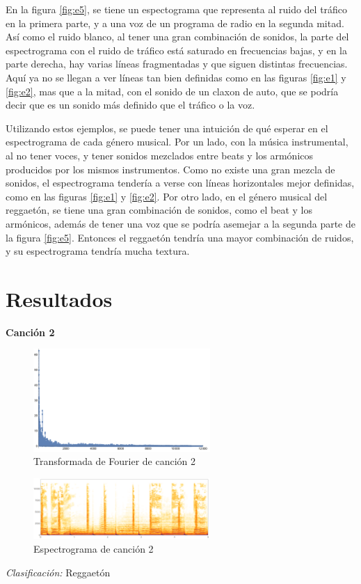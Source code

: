 \documentclass[12pt, letterpaper]{article}
\begin{document}
\noindent En la figura \ref{fig:e5}, se tiene un espectograma que representa al
ruido del tráfico en la primera parte, y a una voz de un programa de radio en la segunda
mitad. Así como el ruido blanco, al tener una gran combinación de sonidos, la
parte del espectrograma con el ruido de tráfico está saturado en frecuencias bajas,
y en la parte derecha, hay varias líneas fragmentadas y que siguen distintas frecuencias.
Aquí ya no se llegan a ver líneas tan bien definidas como en las figuras
\ref{fig:e1} y \ref{fig:e2}, mas que a la mitad, con el
sonido de un claxon de auto, que se podría decir que es un sonido más definido
que el tráfico o la voz. \medskip

\noindent Utilizando estos ejemplos, se puede tener una intuición de qué esperar
en el espectrograma de cada género musical. Por un lado, con la música instrumental,
al no tener voces, y tener sonidos mezclados entre beats y los armónicos producidos
por los mismos instrumentos. Como no existe una gran mezcla de sonidos, el espectrograma
tendería a verse con líneas horizontales mejor definidas, como en las figuras
\ref{fig:e1} y \ref{fig:e2}. Por otro lado, en el género musical del reggaetón, se tiene
una gran combinación de sonidos, como el beat y los armónicos, además de tener una voz
que se podría asemejar a la segunda parte de la figura \ref{fig:e5}. Entonces el reggaetón
tendría una mayor combinación de ruidos, y su espectrograma tendría mucha textura.

\section{Resultados}

\textbf{Canción 2}
\begin{figure}[H]
  \centering
  \includegraphics[width=0.6\textwidth]{fourier_02.png}
  \caption{Transformada de Fourier de canción 2}
\end{figure}
\begin{figure}[H]
  \centering
  \includegraphics[width=0.6\textwidth]{espec_02.png}
  \caption{Espectrograma de canción 2}
\end{figure}
\textit{Clasificación:}
Reggaetón
\end{document}
